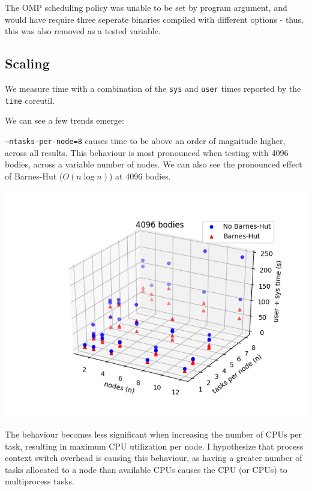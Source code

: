 \documentclass[11pt,a4paper]{article}
\begin{document}
The OMP scheduling policy was unable to be set by program argument, and would have require three seperate binaries compiled with different options - thus, this was also removed as a tested variable.


\subsection*{Scaling}

We measure time with a combination of the \texttt{sys} and \texttt{user} times reported by the \texttt{time} coreutil. 

We can see a few trends emerge:

\texttt{--ntasks-per-node=8} causes time to be above an order of magnitude higher, across all results. This behaviour is most pronounced when testing with 4096 bodies, across a variable number of nodes. We can also see the pronounced effect of Barnes-Hut ($O(n \log n)$) at 4096 bodies.


\includegraphics[width=14.2cm]{4096-nodes-tasksPerNode}

The behaviour becomes less significant when increasing the number of CPUs per task, resulting in maximum CPU utilization per node. I hypothesize that process context switch overhead is causing this behaviour, as having a greater number of tasks allocated to a node than available CPUs causes the CPU (or CPUs) to multiprocess tasks. 
\end{document}
